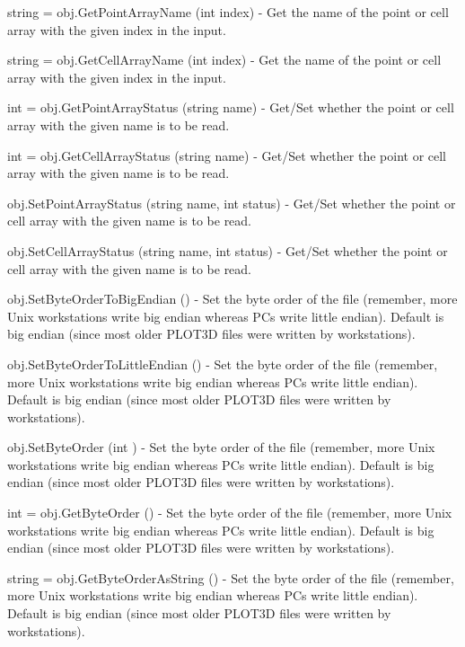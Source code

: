 \begin{DoxyItemize}
\item {\ttfamily string = obj.\-Get\-Point\-Array\-Name (int index)} -\/ Get the name of the point or cell array with the given index in the input.  
\item {\ttfamily string = obj.\-Get\-Cell\-Array\-Name (int index)} -\/ Get the name of the point or cell array with the given index in the input.  
\item {\ttfamily int = obj.\-Get\-Point\-Array\-Status (string name)} -\/ Get/\-Set whether the point or cell array with the given name is to be read.  
\item {\ttfamily int = obj.\-Get\-Cell\-Array\-Status (string name)} -\/ Get/\-Set whether the point or cell array with the given name is to be read.  
\item {\ttfamily obj.\-Set\-Point\-Array\-Status (string name, int status)} -\/ Get/\-Set whether the point or cell array with the given name is to be read.  
\item {\ttfamily obj.\-Set\-Cell\-Array\-Status (string name, int status)} -\/ Get/\-Set whether the point or cell array with the given name is to be read.  
\item {\ttfamily obj.\-Set\-Byte\-Order\-To\-Big\-Endian ()} -\/ Set the byte order of the file (remember, more Unix workstations write big endian whereas P\-Cs write little endian). Default is big endian (since most older P\-L\-O\-T3\-D files were written by workstations).  
\item {\ttfamily obj.\-Set\-Byte\-Order\-To\-Little\-Endian ()} -\/ Set the byte order of the file (remember, more Unix workstations write big endian whereas P\-Cs write little endian). Default is big endian (since most older P\-L\-O\-T3\-D files were written by workstations).  
\item {\ttfamily obj.\-Set\-Byte\-Order (int )} -\/ Set the byte order of the file (remember, more Unix workstations write big endian whereas P\-Cs write little endian). Default is big endian (since most older P\-L\-O\-T3\-D files were written by workstations).  
\item {\ttfamily int = obj.\-Get\-Byte\-Order ()} -\/ Set the byte order of the file (remember, more Unix workstations write big endian whereas P\-Cs write little endian). Default is big endian (since most older P\-L\-O\-T3\-D files were written by workstations).  
\item {\ttfamily string = obj.\-Get\-Byte\-Order\-As\-String ()} -\/ Set the byte order of the file (remember, more Unix workstations write big endian whereas P\-Cs write little endian). Default is big endian (since most older P\-L\-O\-T3\-D files were written by workstations).  

\end{DoxyItemize}
